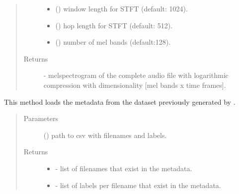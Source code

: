 \documentclass[letterpaper,10pt,english]{sphinxmanual}
\begin{document}
\begin{fulllineitems}
\begin{fulllineitems}
\begin{quote}
\begin{description}
\begin{itemize}
\item {} 
 () \textendash{} window length for STFT (default: 1024).

\item {} 
 () \textendash{} hop length for STFT (default: 512).

\item {} 
 () \textendash{} number of mel bands (default:128).

\end{itemize}

\item[{Returns}] \leavevmode
{}  - melspectrogram of the complete audio file with logarithmic compression with dimensionality {[}mel bands x time frames{]}.

\end{description}\end{quote}

\end{fulllineitems}


\begin{fulllineitems}
\label{\detokenize{generate_dataset:generate_dataset.GenerateDataset.load_metadata}}
This method loads the metadata from the dataset previously generated 
by .
\begin{quote}\begin{description}
\item[{Parameters}] \leavevmode
{} () \textendash{} path to csv with filenames and labels.

\item[{Returns}] \leavevmode
\begin{itemize}
\item {} 
  - list of filenames that exist in the metadata.

\item {} 
  - list of labels per filename that exist in the metadata.


\end{itemize}
\end{description}
\end{quote}
\end{fulllineitems}
\end{fulllineitems}
\end{document}
